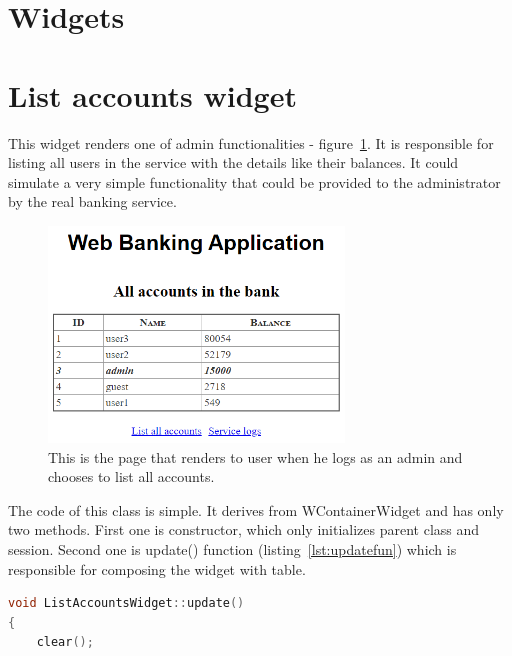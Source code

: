 \documentclass[a4paper,12pt]{book}
\newcommand\tab[1][1cm]{\hspace*{#1}}
\begin{document}
\section{Widgets}
{
\section*{List accounts widget}
{

\tab This widget renders one of admin functionalities - figure~\ref{fig:accounts}. It is responsible for listing all users in the service with the details like their balances. It could simulate a very simple functionality that could be provided to the administrator by the real banking service. 

\begin{figure}[H]
\centering
\includegraphics[width=0.7\textwidth]{listaccounts}
\caption{This is the page that renders to user when he logs as an admin and chooses to list all accounts.}
\label{fig:accounts}
\end{figure}  

The code of this class is simple. It derives from WContainerWidget and has only two methods. First one is constructor, which only initializes parent class and session. Second one is update() function (listing~\ref{lst:updatefun}) which is responsible for composing the widget with table.

\bigskip
\begin{lstlisting}[frame=single, label={lst:updatefun}, basicstyle=\small, language=C++, caption={ListAccountsWidget::update() function. Assuming that you use a compiler with C++14 support you can use std::make unique instead of Wt::cpp14::make unique. In the application std::make unique was used because it allows us to have a better control of the lifetime of the widget. For instance if we want to, we can retrieve a std::unique ptr with  WObject::removeChild() function, which ultimately will unplug a single widget. The disadvantage of using this smart pointer is the fact that we are dealing with a raw pointer and as always it's ownership must be changed carefully, otherwise it might cause a memory leak.}, captionpos=b]
void ListAccountsWidget::update()
{
    clear();


\end{lstlisting}}}
\end{document}
